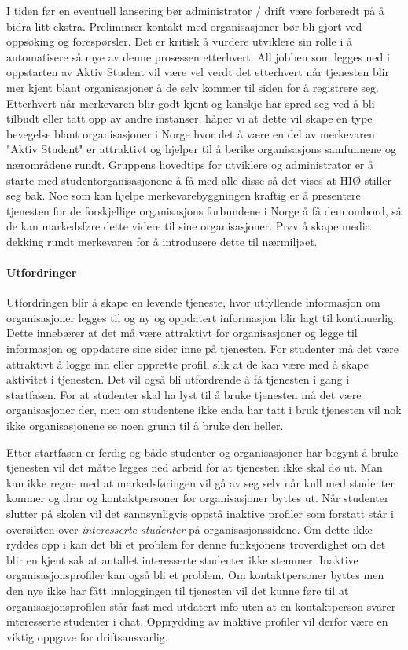 I tiden før en eventuell lansering bør administrator / drift være forberedt på å bidra litt ekstra. Preliminær kontakt med organisasjoner bør bli gjort ved oppsøking og forespørsler. Det er kritisk å vurdere utviklere sin rolle i å automatisere så mye av denne prosessen etterhvert. All jobben som legges ned i oppstarten av Aktiv Student vil være vel verdt det etterhvert når tjenesten blir mer kjent blant organisasjoner å de selv kommer til siden for å registrere seg. Etterhvert når merkevaren blir godt kjent og kanskje har spred seg ved å bli tilbudt eller tatt opp av andre instanser, håper vi at dette vil skape en type bevegelse blant organisasjoner i Norge hvor det å være en del av merkevaren "Aktiv Student" er attraktivt og hjelper til å berike organisasjons samfunnene og nærområdene rundt. Gruppens hovedtips for utviklere og administrator er å starte med studentorganisasjonene å få med alle disse så det vises at HIØ stiller seg bak. Noe som kan hjelpe merkevarebyggningen kraftig er å presentere tjenesten for de forskjellige organisasjons forbundene i Norge å få dem ombord, så de kan markedsføre dette videre til sine organisasjoner. Prøv å skape media dekking rundt merkevaren for å introdusere dette til nærmiljøet. 

\paragraph{Utfordringer}
Utfordringen blir å skape en levende tjeneste, hvor utfyllende informasjon om organisasjoner legges til og ny og oppdatert informasjon blir lagt til kontinuerlig. Dette innebærer at det må være attraktivt for organisasjoner og legge til informasjon og oppdatere sine sider inne på tjenesten. For studenter må det være attraktivt å logge inn eller opprette profil, slik at de kan være med å skape aktivitet i tjenesten. Det vil også bli utfordrende å få tjenesten i gang i startfasen. For at studenter skal ha lyst til å bruke tjenesten må det være organisasjoner der, men om studentene ikke enda har tatt i bruk tjenesten vil nok ikke organisasjonene se noen grunn til å bruke den heller.

Etter startfasen er ferdig og både studenter og organisasjoner har begynt å bruke tjenesten vil det måtte legges ned arbeid for at tjenesten ikke skal dø ut. Man kan ikke regne med at markedsføringen vil gå av seg selv når kull med studenter kommer og drar og kontaktpersoner for organisasjoner byttes ut. Når studenter slutter på skolen vil det sannsynligvis oppstå inaktive profiler som forstatt står i oversikten over {\em interesserte studenter} på organisasjonssidene. Om dette ikke ryddes opp i kan det bli et problem for denne funksjonens troverdighet om det blir en kjent sak at antallet interesserte studenter ikke stemmer. Inaktive organisasjonsprofiler kan også bli et problem. Om kontaktpersoner byttes men den nye ikke har fått innloggingen til tjenesten vil det kunne føre til at organisasjonsprofilen står fast med utdatert info uten at en kontaktperson svarer interesserte studenter i chat. Opprydding av inaktive profiler vil derfor være en viktig oppgave for driftsansvarlig.

